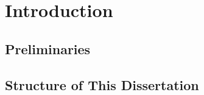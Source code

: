 \chapter{Introduction}

    \section{Preliminaries}
        \label{introduction-preliminaries}
        \lipsum[4]

    \section{Structure of This Dissertation}
        \label{introduction-structure}
        \lipsum[3]